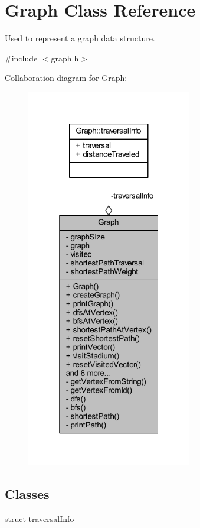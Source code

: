 \hypertarget{class_graph}{}\section{Graph Class Reference}
\label{class_graph}


Used to represent a graph data structure.  




{\ttfamily \#include $<$graph.\+h$>$}



Collaboration diagram for Graph\+:\nopagebreak
\begin{figure}[H]
\begin{center}
\leavevmode
\includegraphics[width=205pt]{class_graph__coll__graph}
\end{center}
\end{figure}
\subsection*{Classes}
\begin{DoxyCompactItemize}
\item 
struct \hyperlink{struct_graph_1_1traversal_info}{traversal\+Info}
\end{DoxyCompactItemize}
